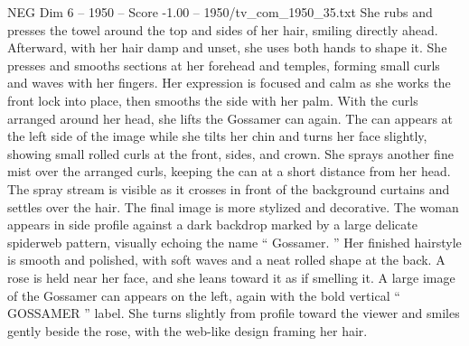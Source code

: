 \begin{textsample}{NEG Dim 6 – 1950 – Score -1.00 – 1950/tv\_com\_1950\_35.txt}
She rubs and presses the towel around the top and sides of her hair, smiling directly ahead.
Afterward, with her hair damp and unset, she uses both hands to shape it.
She presses and smooths sections at her forehead and temples, forming small curls and waves with her fingers.
Her expression is focused and calm as she works the front lock into place, then smooths the side with her palm.
With the curls arranged around her head, she lifts the Gossamer can again.
The can appears at the left side of the image while she tilts her chin and turns her face slightly, showing small rolled curls at the front, sides, and crown.
She sprays another fine mist over the arranged curls, keeping the can at a short distance from her head.
The spray stream is visible as it crosses in front of the background curtains and settles over the hair.
The final image is more stylized and decorative.
The woman appears in side profile against a dark backdrop marked by a large delicate spiderweb pattern, visually echoing the name “ Gossamer. ” Her finished hairstyle is smooth and polished, with soft waves and a neat rolled shape at the back.
A rose is held near her face, and she leans toward it as if smelling it.
A large image of the Gossamer can appears on the left, again with the bold vertical “ GOSSAMER ” label.
She turns slightly from profile toward the viewer and smiles gently beside the rose, with the web-like design framing her hair.

\end{textsample}
